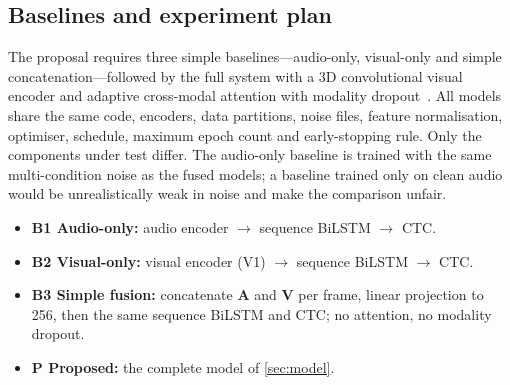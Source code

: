 \subsection{Baselines and experiment plan}
The proposal requires three simple baselines---audio-only, visual-only and
simple concatenation---followed by the full system with a 3D convolutional
visual encoder and adaptive cross-modal attention with modality
dropout~\spec. All models share the same code, encoders, data partitions,
noise files, feature normalisation, optimiser, schedule, maximum epoch count and
early-stopping rule. Only the components under test differ. The audio-only
baseline is trained with the same multi-condition noise as the fused models; a
baseline trained only on clean audio would be unrealistically weak in noise and
make the comparison unfair.

\begin{itemize}
  \item \textbf{B1 Audio-only:} audio encoder $\rightarrow$ sequence BiLSTM $\rightarrow$ CTC.
  \item \textbf{B2 Visual-only:} visual encoder (V1) $\rightarrow$ sequence BiLSTM $\rightarrow$ CTC.
  \item \textbf{B3 Simple fusion:} concatenate $\mathbf{A}$ and $\mathbf{V}$ per frame,
        linear projection to 256, then the same sequence BiLSTM and CTC; no attention,
        no modality dropout.
  \item \textbf{P Proposed:} the complete model of \cref{sec:model}.
\end{itemize}

